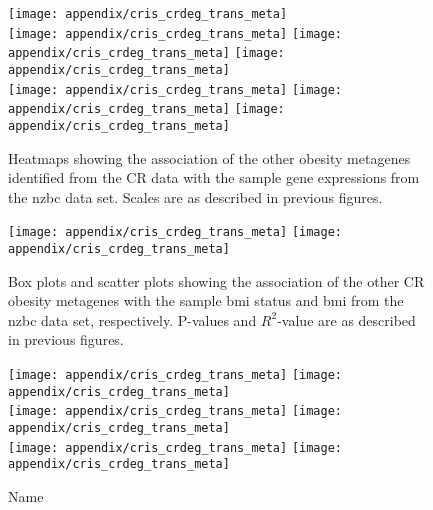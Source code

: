 \begin{appendices}
	\begin{figure}[htp!]
		\centering
		\texttt{[image: appendix/cris\_crdeg\_trans\_meta]}\\
		\texttt{[image: appendix/cris\_crdeg\_trans\_meta]}
		\texttt{[image: appendix/cris\_crdeg\_trans\_meta]}
		\texttt{[image: appendix/cris\_crdeg\_trans\_meta]}\\
		\texttt{[image: appendix/cris\_crdeg\_trans\_meta]}
		\texttt{[image: appendix/cris\_crdeg\_trans\_meta]}
		\texttt{[image: appendix/cris\_crdeg\_trans\_meta]}\\
		\caption[Association of the other CR obesity metagenes with the sample gene expressions in the \gls{nzbc} data]{Heatmaps showing the association of the other obesity metagenes identified from the CR data with the sample gene expressions from the \gls{nzbc} data set.
		Scales are as described in previous figures.}
		\label{fig:appendix/rest_of_cr_ob_meta_heatmap_cris}
	\end{figure}

	\begin{figure}[htpb]
		\centering
		\texttt{[image: appendix/cris\_crdeg\_trans\_meta]}
		\hfill
		\texttt{[image: appendix/cris\_crdeg\_trans\_meta]}\\
		\caption[Association of the other CR obesity metagenes with the sample \gls{bmi}/\gls{bmi} status in the \gls{nzbc} data]{Box plots and scatter plots showing the association of the other CR obesity metagenes with the sample \gls{bmi} status  and \gls{bmi} from the \gls{nzbc} data set, respectively.
		P-values and $R^2$-value are as described in previous figures.}
		\label{fig:appendix/rest_of_cr_ob_meta_box_scatter_cris}
	\end{figure}

	\begin{figure}[htpb]
		\ContinuedFloat
		\captionsetup{list=off,format=cont}
		\centering
		\texttt{[image: appendix/cris\_crdeg\_trans\_meta]}
		\hfill
		\texttt{[image: appendix/cris\_crdeg\_trans\_meta]}\\
		\texttt{[image: appendix/cris\_crdeg\_trans\_meta]}
		\hfill
		\texttt{[image: appendix/cris\_crdeg\_trans\_meta]}\\
		\texttt{[image: appendix/cris\_crdeg\_trans\_meta]}
		\hfill
		\texttt{[image: appendix/cris\_crdeg\_trans\_meta]}\\
		\caption{Name}
	\end{figure}


\end{appendices}
